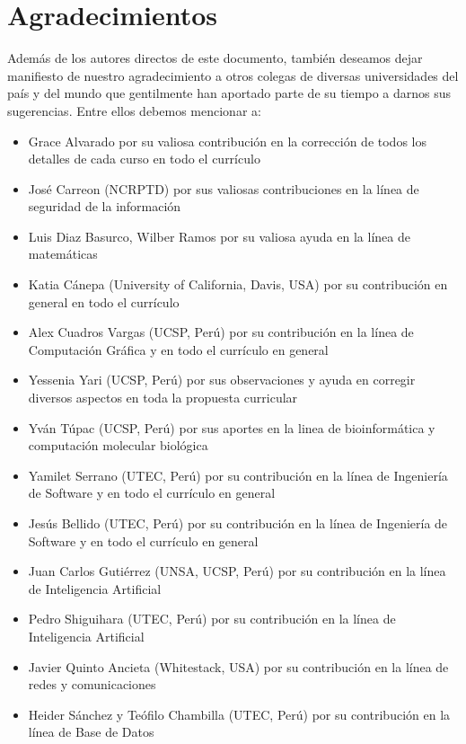 \chapter*{Agradecimientos}\label{chap:cs-ack}
%

Además de los autores directos de este documento, también deseamos dejar manifiesto de nuestro 
agradecimiento a otros colegas de diversas universidades del país y del mundo que gentilmente 
han aportado parte de su tiempo a darnos sus sugerencias. Entre ellos debemos mencionar a:

\begin{itemize}
\item Grace Alvarado por su valiosa contribución en la corrección de todos los detalles de cada curso en todo el currículo
\item José Carreon (NCRPTD) por sus valiosas contribuciones en la línea de seguridad de la información
\item Luis Diaz Basurco, Wilber Ramos por su valiosa ayuda en la línea de matemáticas
\item Katia Cánepa (University of California, Davis, USA) por su contribución en general en todo el currículo
\item Alex Cuadros Vargas (UCSP, Perú) por su contribución en la línea de Computación Gráfica y en todo el currículo en general
\item Yessenia Yari (UCSP, Perú) por sus observaciones y ayuda en corregir diversos aspectos en toda la propuesta curricular
\item Yván Túpac (UCSP, Perú) por sus aportes en la linea de bioinformática y computación molecular biológica
\item Yamilet Serrano (UTEC, Perú) por su contribución en la línea de Ingeniería de Software y en todo el currículo en general
\item Jesús Bellido (UTEC, Perú) por su contribución en la línea de Ingeniería de Software y en todo el currículo en general
\item Juan Carlos Gutiérrez (UNSA, UCSP, Perú) por su contribución en la línea de Inteligencia Artificial 
\item Pedro Shiguihara (UTEC, Perú) por su contribución en la línea de Inteligencia Artificial 
\item Javier Quinto Ancieta (Whitestack, USA) por su contribución en la línea de redes y comunicaciones
\item Heider Sánchez y Teófilo Chambilla (UTEC, Perú) por su contribución en la línea de Base de Datos

\end{itemize}
